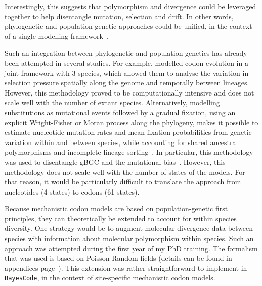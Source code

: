 Interestingly, this suggests that polymorphism and divergence could be leveraged together to help disentangle mutation, selection and drift.
In other words, phylogenetic and population-genetic approaches could be unified, in the context of a single modelling framework~\citep{Thorne2012}.

Such an integration between phylogenetic and population genetics has already been attempted in several studies.
For example, \citet{Wilson2011} modelled codon evolution in a joint framework with $3$ species, which allowed them to analyse the variation in selection pressure spatially along the genome and temporally between lineages.
However, this methodology proved to be computationally intensive and does not scale well with the number of extant species.
Alternatively, modelling substitutions as mutational events followed by a gradual fixation, using an explicit Wright-Fisher or Moran process along the phylogeny, makes it possible to estimate nucleotide mutation rates and mean fixation probabilities from genetic variation within and between species, while accounting for shared ancestral polymorphisms and incomplete lineage sorting~\citep{DeMaio2013, Schrempf2016, Bergman2018, Schrempf2019}.
In particular, this methodology was used to disentangle \acrshort{gBGC} and the mutational bias~\citep{Borges2019, Borges2020}.
However, this methodology does not scale well with the number of states of the models.
For that reason, it would be particularly difficult to translate the approach from nucleotides (4 states) to codons (61 states).

Because mechanistic codon models are based on population-genetic first principles, they can theoretically be extended to account for within species diversity.
One strategy would be to augment molecular divergence data between species with information about molecular polymorphism within species.
Such an approach was attempted during the first year of my PhD training.
The formalism that was used is based on Poisson Random fields (details can be found in appendices page~\pageref{sec-appendix:PRF}).
This extension was rather straightforward to implement in \texttt{BayesCode}, in the context of site-specific mechanistic codon models.

